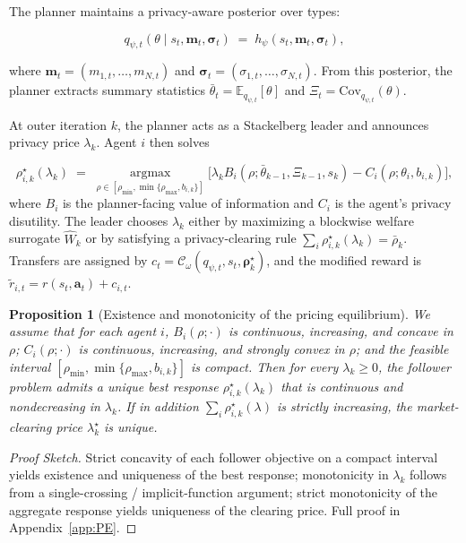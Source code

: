 \documentclass{article}
\newtheorem{proposition}{Proposition}
\begin{document}
The planner maintains a privacy-aware posterior over types:

$$q_{\psi,t}(\theta \mid s_t, \mathbf{m}_t, \boldsymbol{\sigma}_t) \;=\; h_\psi(s_t, \mathbf{m}_t, \boldsymbol{\sigma}_t),$$

where $\mathbf{m}_t = (m_{1,t}, \ldots, m_{N,t})$ and $\boldsymbol{\sigma}_t = (\sigma_{1,t}, \ldots, \sigma_{N,t})$. From this posterior, the planner extracts summary statistics $\bar{\theta}_t = \mathbb{E}_{q_{\psi,t}}[\theta]$ and $\Xi_t = \mathrm{Cov}_{q_{\psi,t}}(\theta)$.

At outer iteration $k$, the planner acts as a Stackelberg leader and announces privacy price $\lambda_k$. Agent $i$ then solves

$$\rho_{i,k}^\star(\lambda_k) \;=\; \operatorname*{argmax}_{\rho \in [\rho_{\min}, \min\{\rho_{\max}, b_{i,k}\}]} \Big[\lambda_k B_i(\rho; \bar\theta_{k-1}, \Xi_{k-1}, s_k) - C_i(\rho; \theta_i, b_{i,k})\Big],$$
where $B_i$ is the planner-facing value of information and $C_i$ is the agent's privacy disutility. The leader chooses $\lambda_k$ either by maximizing a blockwise welfare surrogate $\hat W_k$ or by satisfying a privacy-clearing rule $\sum_i \rho_{i,k}^\star(\lambda_k) = \bar\rho_k$. Transfers are assigned by $c_t = \mathcal{C}_\omega(q_{\psi,t}, s_t, \boldsymbol{\rho}_k^\star)$, and the modified reward is $\tilde r_{i,t} = r(s_t, \mathbf{a}_t) + c_{i,t}$.

\begin{proposition}[Existence and monotonicity of the pricing equilibrium]
    \label{pro:PE}
    We assume that for each agent $i$, $B_i(\rho; \cdot)$ is continuous, increasing, and concave in $\rho$; $C_i(\rho; \cdot)$ is continuous, increasing, and strongly convex in $\rho$; and the feasible interval $[\rho_{\min}, \min\{\rho_{\max}, b_{i,k}\}]$ is compact. Then for every $\lambda_k \ge 0$, the follower problem admits a unique best response $\rho_{i,k}^\star(\lambda_k)$ that is continuous and nondecreasing in $\lambda_k$. If in addition $\sum_i \rho_{i,k}^\star(\lambda)$ is strictly increasing, the market-clearing price $\lambda_k^\star$ is unique.
\end{proposition}

\begin{proof}
    [Proof Sketch]
    Strict concavity of each follower objective on a compact interval yields existence and uniqueness of the best response; monotonicity in $\lambda_k$ follows from a single-crossing / implicit-function argument; strict monotonicity of the aggregate response yields uniqueness of the clearing price. Full proof in Appendix~\ref{app:PE}. 
\end{proof}
\end{document}
